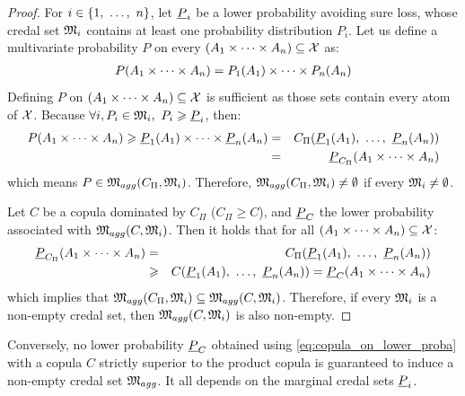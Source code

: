 \begin{proof}
    For $i\in\{1 , ~\ldots, ~ n\}$, let $\underline{P}_i$ be a lower probability avoiding sure loss, \ie whose credal set $\mathfrak{M}_i$ contains at least one probability distribution $P_i$. Let us define a multivariate probability $P$ on every $(A_1\times\dots\times A_n)\subseteq\mathcal{X}$ as:
    \begin{eqnarray*}
        P(A_1\times\dots\times A_n) = P_1(A_1)\times\dots\times P_n(A_n)
    \end{eqnarray*}
    Defining $P$ on $(A_1\times\dots\times A_n)\subseteq\mathcal{X}$ is sufficient as those sets contain every atom of $\mathcal{X}$.
    Because $\forall i, P_i\in\mathfrak{M}_i,~P_i\geqslant \underline{P}_i$, then:
    \begin{eqnarray*}
        P(A_1\times\dots\times A_n) \geqslant \underline{P}_1(A_1)\times\dots\times \underline{P}_n(A_n) &=& C_\Pi(\underline{P}_1(A_1) , ~\ldots, ~ \underline{P}_n(A_n))\\
        &=& \underline{P}_{C_\Pi}(A_1\times\dots\times A_n)
    \end{eqnarray*}
which means $P\in\mathfrak{M}_{agg}(C_\Pi, \mathfrak{M}_i)$. Therefore, $\mathfrak{M}_{agg}(C_\Pi, \mathfrak{M}_i)\neq\emptyset$ if every $\mathfrak{M}_i\neq\emptyset$.

Let $C$ be a copula dominated by $C_\Pi$ (\ie $C_\Pi\geqslant C$), and $\underline{P}_C$ the lower probability associated with $\mathfrak{M}_{agg}(C, \mathfrak{M}_i)$. Then it holds that for all $(A_1\times\dots\times A_n)\subseteq\mathcal{X}$:
\begin{eqnarray*}
\underline{P}_{C_\Pi}(A_1\times\dots\times A_n)&=&C_\Pi(\underline{P}_1(A_1) , ~\ldots, ~ \underline{P}_n(A_n)) \\
    &\geqslant& C(\underline{P}_1(A_1) , ~\ldots, ~  \underline{P}_n(A_n)) = \underline{P}_C(A_1\times\dots\times A_n)
\end{eqnarray*}
which implies that $\mathfrak{M}_{agg}(C_\Pi, \mathfrak{M}_i)\subseteq \mathfrak{M}_{agg}(C, \mathfrak{M}_i)$. Therefore, if every $\mathfrak{M}_i$ is a non-empty credal set, then $ \mathfrak{M}_{agg}(C, \mathfrak{M}_i)$ is also non-empty.
\end{proof}

\begin{proposition}
    Conversely, no lower probability $\underline{P}_C$ obtained using \eqref{eq:copula_on_lower_proba} with a copula $C$ strictly superior to the product copula is guaranteed to induce a non-empty credal set $\mathfrak{M}_{agg}$. It all depends on the marginal credal sets $\underline{P}_i$.
\end{proposition}

